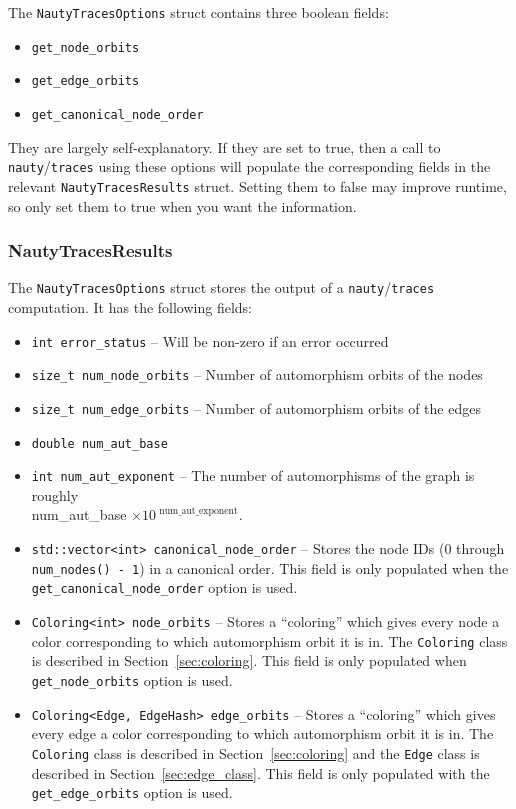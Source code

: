 \documentclass{article}
\begin{document}
The \verb|NautyTracesOptions| struct contains three boolean fields:

\begin{itemize}
    \setlength\itemsep{-0.1em}
    \item \verb|get_node_orbits|
    \item \verb|get_edge_orbits|
    \item \verb|get_canonical_node_order|
\end{itemize}

They are largely self-explanatory. If they are set to true, then a call to \verb|nauty|/\verb|traces| using these options will populate the corresponding fields in the relevant \verb|NautyTracesResults| struct. Setting them to false may improve runtime, so only set them to true when you want the information.

\subsubsection{NautyTracesResults}

The \verb|NautyTracesOptions| struct stores the output of a \verb|nauty|/\verb|traces| computation. It has the following fields:


\begin{itemize}
    \setlength\itemsep{-0.1em}
    \item \verb|int error_status| -- Will be non-zero if an error occurred
    \item \verb|size_t num_node_orbits| -- Number of automorphism orbits of the nodes
    \item \verb|size_t num_edge_orbits| -- Number of automorphism orbits of the edges
    \item \verb|double num_aut_base|
    \item \verb|int num_aut_exponent| -- The number of automorphisms of the graph is roughly \\
    {\large num\_aut\_base $\times 10^\text{ num\_aut\_exponent}$}.
    \item \verb|std::vector<int> canonical_node_order| -- Stores the node IDs (0 through \verb|num_nodes() - 1|) in a canonical order. This field is only populated when the \verb|get_canonical_node_order| option is used.
    \item \verb|Coloring<int> node_orbits| -- Stores a ``coloring'' which gives every node a color corresponding to which automorphism orbit it is in. The \verb|Coloring| class is described in Section~\ref{sec:coloring}. This field is only populated when \verb|get_node_orbits| option is used.
    \item \verb|Coloring<Edge, EdgeHash> edge_orbits| -- Stores a ``coloring'' which gives every edge a color corresponding to which automorphism orbit it is in. The \verb|Coloring| class is described in Section~\ref{sec:coloring} and the \verb|Edge| class is described in Section~\ref{sec:edge_class}. This field is only populated with the \verb|get_edge_orbits| option is used.
\end{itemize}
\end{document}
